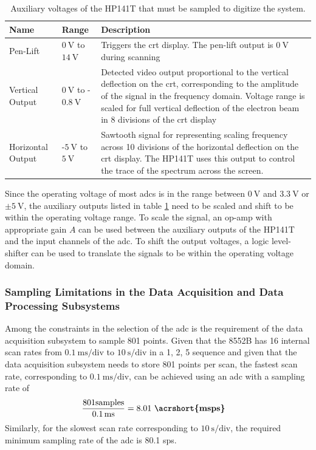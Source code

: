 \documentclass[class=report,11pt,crop=false]{standalone}
\begin{document}
	\begin{table}[!ht]
		\centering
		\begin{tabular}{|m{5em}|m{8em}|m{25em}|}
			\hline
			\cellcolor{cyan!25}\textbf{Name} & \cellcolor{cyan!25}\textbf{Range} & \cellcolor{cyan!25}\textbf{Description}\\
			\hline
			 Pen-Lift	&$\SI{0}{\volt}$ to $\SI{14}{\volt}$ & Triggers the \acrshort{crt} display. The pen-lift output is $\SI{0}{\volt}$ during scanning\\
			\hline
			Vertical Output	& $\SI{0}{\volt}$ to -$\SI{0.8}{\volt}$	& Detected video output proportional to the vertical deflection on the \acrshort{crt}, corresponding to the amplitude of the signal in the frequency domain. Voltage range is scaled for full vertical deflection of the electron beam in 8 divisions of the \acrshort{crt} display \\
			\hline
			 Horizontal Output	& -$\SI{5}{\volt}$ to $\SI{5}{\volt}$ & Sawtooth signal for representing scaling frequency across 10 divisions of the horizontal deflection on the \acrshort{crt} display. The HP141T uses this output to control the trace of the spectrum across the screen. \\
			\hline
		\end{tabular}
		\label{tab:hp141t-output-voltages}
		\caption{Auxiliary voltages of the HP141T that must be sampled to digitize the system.}
	\end{table}

	Since the operating voltage of most \acrshort{adc}s is in the range between $\SI{0}{\volt}$ and $\SI{3.3}{\volt}$ or $\pm\SI{5}{\volt}$, the auxiliary outputs listed in table \ref{tab:hp141t-output-voltages} need to be scaled and shift to be within the operating voltage range. To scale the signal, an op-amp with appropriate gain $A$ can be used between the auxiliary outputs of the HP141T and the input channels of the \acrshort{adc}. To shift the output voltages, a logic level-shifter can be used to translate the signals to be within the operating voltage domain. 

	\subsubsection{Sampling Limitations in the Data Acquisition and Data Processing Subsystems}
		
	Among the constraints in the selection of the \acrshort{adc} is the requirement of the data acquisition subsystem to sample 801 points. Given that the 8552B has 16 internal scan rates from $\SI{0.1}{\milli\second}/\text{div}$ to $\SI{10}{\second}/\text{div}$ in a 1, 2, 5 sequence and given that the data acquisition subsystem needs to store 801 points per scan, the fastest scan rate, corresponding to $\SI{0.1}{\milli\second}/\text{div}$, can be achieved using an \acrshort{adc} with a sampling rate of 
	\begin{align}
		\frac{801\text{samples}}{\SI{0.1}{\milli\second}}	& = 8.01~\textbf{\acrshort{msps}}\nonumber
	\end{align}
	Similarly, for the slowest scan rate corresponding to $\SI{10}{\second}/\text{div}$, the required minimum sampling rate of the \acrshort{adc} is 80.1 \acrshort{sps}.
	
\end{document}
